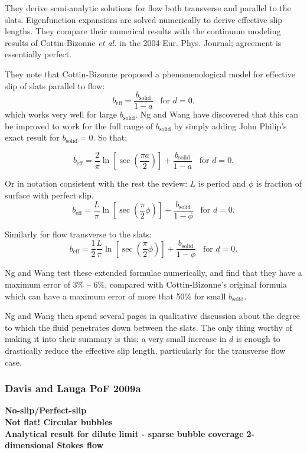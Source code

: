 \documentclass{article}
\newcommand{\beff}{\ensuremath{b_{\mathrm{eff}}}}
\begin{document}
They derive semi-analytic solutions for flow both transverse and parallel to the slats.  Eigenfunction expansions are solved numerically to derive effective slip lengths.  They compare their numerical results with the continuum modeling results of Cottin-Bizonne \emph{et al.} in the 2004 Eur. Phys. Journal; agreement is essentially perfect.

They note that Cottin-Bizonne proposed a phenomenological model for effective slip of slats parallel to flow:
\[ \beff = \frac{b_{\mathrm{solid}}}{1-a} \;\;\; \text{for } d = 0. \]
which works very well for large $b_{\mathrm{solid}}$. Ng and Wang have discovered that this can be improved to work for the full range of $b_{\mathrm{solid}}$ by simply adding John Philip's exact result for $b_{\mathrm{solid}} = 0$. So that:

\[ \beff = \frac{2}{\pi} \ln \left[ \sec \left( \frac{\pi a}{2} \right) \right]
 + \frac{b_{\mathrm{solid}}}{1-a} \;\;\; \text{for } d = 0. \]
 
 Or in notation consistent with the rest the review: $L$ is period and $\phi$ is fraction of surface with perfect slip. 
 \[ \beff = \frac{L}{\pi} \ln \left[ \sec \left( \frac{\pi}{2} \phi \right) \right]
 + \frac{b_{\mathrm{solid}}}{1-\phi} \;\;\; \text{for } d = 0. \]
 
Similarly for flow transverse to the slats:
\[ \beff = \frac{1}{2} \frac{L}{\pi} \ln \left[ \sec \left( \frac{\pi}{2} \phi \right) \right]
 + \frac{b_{\mathrm{solid}}}{1-\phi} \;\;\; \text{for } d = 0. \]

Ng and Wang test these extended formulae numerically, and find that they have a maximum error of 3\% -- 6\%, compared with Cottin-Bizonne's original formula which can have a maximum error of more that 50\% for small $b_{\mathrm{solid}}$.

\vspace*{1em}
Ng and Wang then spend several pages in qualitative discussion about the degree to which the fluid penetrates down between the slats.  The only thing worthy of making it into their summary is this: a very small increase in $d$ is enough to drastically reduce the effective slip length, particularly for the transverse flow case.


\subsubsection*{Davis and Lauga PoF 2009a}

\textbf{No-slip/Perfect-slip}\\
\textbf{Not flat!  Circular bubbles}\\
\textbf{Analytical result for dilute limit - sparse bubble coverage}
\textbf{2-dimensional Stokes flow}\\
\end{document}
